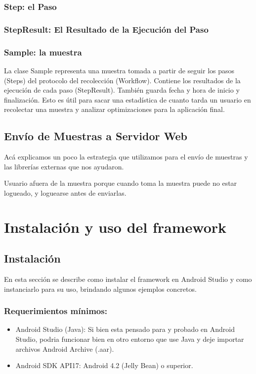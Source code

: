 \subsubsection{Step: el Paso}

\subsubsection{StepResult: El Resultado de la Ejecución del Paso}

\subsubsection{Sample: la muestra}
La clase Sample representa una muestra tomada a partir de seguir los pasos (Steps) del protocolo del recolección (Workflow). Contiene los resultados de la ejecución de cada paso (StepResult). También guarda fecha y hora de inicio y finalización. Esto es útil para sacar una estadística de cuanto tarda un usuario en recolectar una muestra y analizar optimizaciones para la aplicación final.

\subsection{Envío de Muestras a Servidor Web}
Acá explicamos un poco la estrategia que utilizamos para el envío de muestras y las librerías externas que nos ayudaron.

Usuario afuera de la muestra porque cuando toma la muestra puede no estar logueado, y loguearse antes de enviarlas.

\section{Instalación y uso del framework}
\subsection{Instalación}
En esta sección se describe como instalar el framework en Android Studio y como instanciarlo para su uso, brindando algunos ejemplos concretos.

\subsubsection{Requerimientos mínimos:}

\begin{itemize}
\item Android Studio (Java): Si bien esta pensado para y probado en Android Studio, podria funcionar bien en otro entorno que use Java y deje importar archivos Android Archive (.aar).
\item Android SDK API17: Android 4.2 (Jelly Bean) o superior.
\end{itemize}

